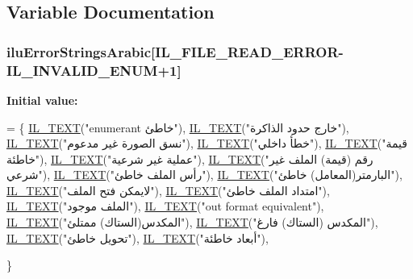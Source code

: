 \subsection{Variable Documentation}
\hypertarget{ilu__err-arabic_8h_aa43b1906aa3e4b3e89e462e2dd63b2a5}{
\subsubsection[{ilu\-Error\-Strings\-Arabic}]{ ilu\-Error\-Strings\-Arabic\mbox{[}{\bf I\-L\-\_\-\-F\-I\-L\-E\-\_\-\-R\-E\-A\-D\-\_\-\-E\-R\-R\-O\-R}-\/{\bf I\-L\-\_\-\-I\-N\-V\-A\-L\-I\-D\-\_\-\-E\-N\-U\-M}+1\mbox{]}}}\label{ilu__err-arabic_8h_aa43b1906aa3e4b3e89e462e2dd63b2a5}
{\bfseries Initial value\-:}
\begin{DoxyCode}
= \{
    \hyperlink{il_8h_a2907c2129d2ba2ebbae6aa6a69b7f685}{IL\_TEXT}(\textcolor{stringliteral}{"enumerant خاطئ"}),
    \hyperlink{il_8h_a2907c2129d2ba2ebbae6aa6a69b7f685}{IL\_TEXT}(\textcolor{stringliteral}{"خارج حدود الذاكرة"}),
    \hyperlink{il_8h_a2907c2129d2ba2ebbae6aa6a69b7f685}{IL\_TEXT}(\textcolor{stringliteral}{"نسق الصورة غير مدعوم"}),
    \hyperlink{il_8h_a2907c2129d2ba2ebbae6aa6a69b7f685}{IL\_TEXT}(\textcolor{stringliteral}{"خطأ داخلي"}),
    \hyperlink{il_8h_a2907c2129d2ba2ebbae6aa6a69b7f685}{IL\_TEXT}(\textcolor{stringliteral}{"قيمة خاطئة"}),
    \hyperlink{il_8h_a2907c2129d2ba2ebbae6aa6a69b7f685}{IL\_TEXT}(\textcolor{stringliteral}{"عملية غير شرعية"}),
    \hyperlink{il_8h_a2907c2129d2ba2ebbae6aa6a69b7f685}{IL\_TEXT}(\textcolor{stringliteral}{"رقم (قيمة) الملف غير شرعي"}),
    \hyperlink{il_8h_a2907c2129d2ba2ebbae6aa6a69b7f685}{IL\_TEXT}(\textcolor{stringliteral}{"رأس الملف خاطئ"}),
    \hyperlink{il_8h_a2907c2129d2ba2ebbae6aa6a69b7f685}{IL\_TEXT}(\textcolor{stringliteral}{"البارمتر(المعامل) خاطئ"}),
    \hyperlink{il_8h_a2907c2129d2ba2ebbae6aa6a69b7f685}{IL\_TEXT}(\textcolor{stringliteral}{"لايمكن فتح الملف"}),
    \hyperlink{il_8h_a2907c2129d2ba2ebbae6aa6a69b7f685}{IL\_TEXT}(\textcolor{stringliteral}{"امتداد الملف خاطئ"}),
    \hyperlink{il_8h_a2907c2129d2ba2ebbae6aa6a69b7f685}{IL\_TEXT}(\textcolor{stringliteral}{"الملف موجود"}),
    \hyperlink{il_8h_a2907c2129d2ba2ebbae6aa6a69b7f685}{IL\_TEXT}(\textcolor{stringliteral}{"out format equivalent"}),
    \hyperlink{il_8h_a2907c2129d2ba2ebbae6aa6a69b7f685}{IL\_TEXT}(\textcolor{stringliteral}{"المكدس(الستاك) ممتلئ"}),
    \hyperlink{il_8h_a2907c2129d2ba2ebbae6aa6a69b7f685}{IL\_TEXT}(\textcolor{stringliteral}{"المكدس (الستاك) فارغ"}),
    \hyperlink{il_8h_a2907c2129d2ba2ebbae6aa6a69b7f685}{IL\_TEXT}(\textcolor{stringliteral}{"تحويل خاطئ"}),
    \hyperlink{il_8h_a2907c2129d2ba2ebbae6aa6a69b7f685}{IL\_TEXT}(\textcolor{stringliteral}{"أبعاد خاطئة"}),

\}
\end{DoxyCode}

